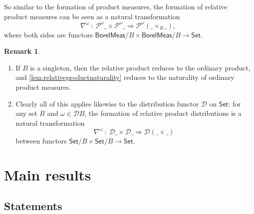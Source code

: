 \documentclass[11pt,a4paper]{scrartcl}
\newcommand{\setc}{\mathsf{Set}}
\newcommand{\borelmeas}{\mathsf{BorelMeas}}
\newcommand{\dist}{\mathcal{D}}
\newcommand{\giry}{\mathcal{P}}
\theoremstyle{definition}
\newtheorem{rem}[theo]{Remark}
\begin{document}
So similar to the formation of product measures,
the formation of relative product measures can be seen as a natural transformation
\begin{equation}
	\label{eq:relativeproductnaturality_giry}
	\nabla^\omega \: : \: \giry^\omega \_ \times \giry^\omega \_ \Longrightarrow \giry^\omega(\_ \times_B \_),
\end{equation}
where both sides are functors $\borelmeas/B \times \borelmeas/B \longrightarrow \setc$.

\begin{rem}
	\begin{enumerate}
		\item 
			If $B$ is a singleton, then the relative product reduces to the ordinary product,
			and \cref{lem:relativeproductnaturality} reduces to the naturality of ordinary product measures.
		\item 
			Clearly all of this applies likewise to the distribution functor $\dist$ on $\setc$:
			for any set $B$ and $\omega \in \dist B$,
			the formation of relative product distributions is a natural transformation
			\begin{equation}
				\label{eq:relativeproductnaturality_dist}
				\nabla^\omega \: : \: \dist\_ \times \dist\_ \Longrightarrow \dist(\_ \times \_)
			\end{equation}
			between functors $\setc/B \times \setc/B \longrightarrow \setc$.
	\end{enumerate}
\end{rem}


\section{Main results}

\subsection{Statements}
\end{document}
